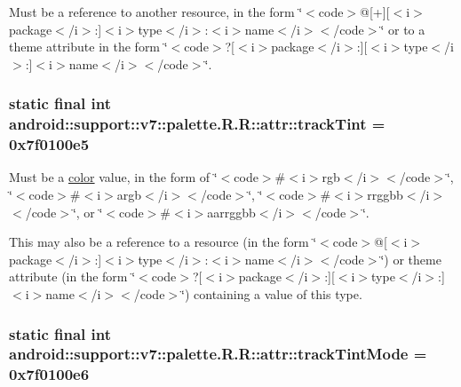 Must be a reference to another resource, in the form \char`\"{}$<$code$>$@\mbox{[}+\mbox{]}\mbox{[}$<$i$>$package$<$/i$>$:\mbox{]}$<$i$>$type$<$/i$>$:$<$i$>$name$<$/i$>$$<$/code$>$\char`\"{} or to a theme attribute in the form \char`\"{}$<$code$>$?\mbox{[}$<$i$>$package$<$/i$>$:\mbox{]}\mbox{[}$<$i$>$type$<$/i$>$:\mbox{]}$<$i$>$name$<$/i$>$$<$/code$>$\char`\"{}. \hypertarget{classandroid_1_1support_1_1v7_1_1palette_1_1_r_1_1attr_5cbc23f0097a34469b54183149d483b1}{
\subsubsection[{trackTint}]{\setlength{\rightskip}{0pt plus 5cm}static final int android::support::v7::palette.R.R::attr::trackTint = 0x7f0100e5}}
\label{classandroid_1_1support_1_1v7_1_1palette_1_1_r_1_1attr_5cbc23f0097a34469b54183149d483b1}


Must be a \hyperlink{classandroid_1_1support_1_1v7_1_1palette_1_1_r_1_1color}{color} value, in the form of \char`\"{}$<$code$>$\#$<$i$>$rgb$<$/i$>$$<$/code$>$\char`\"{}, \char`\"{}$<$code$>$\#$<$i$>$argb$<$/i$>$$<$/code$>$\char`\"{}, \char`\"{}$<$code$>$\#$<$i$>$rrggbb$<$/i$>$$<$/code$>$\char`\"{}, or \char`\"{}$<$code$>$\#$<$i$>$aarrggbb$<$/i$>$$<$/code$>$\char`\"{}. 

This may also be a reference to a resource (in the form \char`\"{}$<$code$>$@\mbox{[}$<$i$>$package$<$/i$>$:\mbox{]}$<$i$>$type$<$/i$>$:$<$i$>$name$<$/i$>$$<$/code$>$\char`\"{}) or theme attribute (in the form \char`\"{}$<$code$>$?\mbox{[}$<$i$>$package$<$/i$>$:\mbox{]}\mbox{[}$<$i$>$type$<$/i$>$:\mbox{]}$<$i$>$name$<$/i$>$$<$/code$>$\char`\"{}) containing a value of this type. \hypertarget{classandroid_1_1support_1_1v7_1_1palette_1_1_r_1_1attr_53448ed69b9946b849a38f2120f3d39d}{
\subsubsection[{trackTintMode}]{\setlength{\rightskip}{0pt plus 5cm}static final int android::support::v7::palette.R.R::attr::trackTintMode = 0x7f0100e6}}
\label{classandroid_1_1support_1_1v7_1_1palette_1_1_r_1_1attr_53448ed69b9946b849a38f2120f3d39d}


